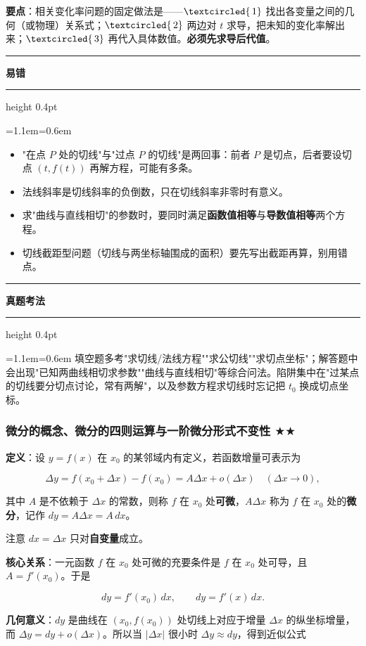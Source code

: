 \documentclass[11pt,openany,UTF8]{ctexbook}
\newcommand{\circled}[1]{\textcircled{\scriptsize\,#1}}
\newcommand{\callouthead}[2]{%
  \par\addvspace{7pt}\noindent
  {\color{#1}\rule[-0.15em]{3pt}{1.05em}}\hspace{0.5em}%
  {\bfseries\color{#1}#2}\par\nobreak\vspace{-0.35em}%
  {\color{rulesep}\hrule height 0.4pt}\nobreak\vspace{0.45em}%
  \begingroup\small\setlength{\parindent}{0pt}%
  \leftskip=1.1em\rightskip=0.6em\noindent\ignorespaces}
\newcommand{\calloutend}{\par\endgroup\addvspace{7pt}}
\newenvironment{callwarn}[1]{\callouthead{warnbar}{#1}}{\calloutend}
\newenvironment{callexam}[1]{\callouthead{exambar}{#1}}{\calloutend}
\begin{document}
\textbf{要点}：相关变化率问题的固定做法是——$\circled{1}$ 找出各变量之间的几何（或物理）关系式；$\circled{2}$ 两边对 $t$ 求导，把未知的变化率解出来；$\circled{3}$ 再代入具体数值。\textbf{必须先求导后代值}。

\begin{callwarn}{易错}
\begin{itemize}
\item "在点 $P$ 处的切线"与"过点 $P$ 的切线"是两回事：前者 $P$ 是切点，后者要设切点 $(t,f(t))$ 再解方程，可能有多条。
\item 法线斜率是切线斜率的负倒数，只在切线斜率非零时有意义。
\item 求"曲线与直线相切"的参数时，要同时满足\textbf{函数值相等}与\textbf{导数值相等}两个方程。
\item 切线截距型问题（切线与两坐标轴围成的面积）要先写出截距再算，别用错点。
\end{itemize}
\end{callwarn}

\begin{callexam}{真题考法}
填空题多考"求切线/法线方程""求公切线""求切点坐标"；解答题中会出现"已知两曲线相切求参数""曲线与直线相切"等综合问法。陷阱集中在"过某点的切线要分切点讨论，常有两解"，以及参数方程求切线时忘记把 $t_0$ 换成切点坐标。

\end{callexam}

\subsubsection{微分的概念、微分的四则运算与一阶微分形式不变性 $\bigstar$$\bigstar$}

\textbf{定义}：设 $y=f(x)$ 在 $x_0$ 的某邻域内有定义，若函数增量可表示为

\[\Delta y=f(x_0+\Delta x)-f(x_0)=A\Delta x+o(\Delta x)\quad(\Delta x\to 0),\]

其中 $A$ 是不依赖于 $\Delta x$ 的常数，则称 $f$ 在 $x_0$ 处\textbf{可微}，$A\Delta x$ 称为 $f$ 在 $x_0$ 处的\textbf{微分}，记作 $dy=A\Delta x=A\,dx$。

注意 $dx=\Delta x$ 只对\textbf{自变量}成立。

\textbf{核心关系}：一元函数 $f$ 在 $x_0$ 处可微的充要条件是 $f$ 在 $x_0$ 处可导，且 $A=f'(x_0)$。于是

\[dy=f'(x_0)\,dx,\qquad dy=f'(x)\,dx.\]

\textbf{几何意义}：$dy$ 是曲线在 $(x_0,f(x_0))$ 处切线上对应于增量 $\Delta x$ 的纵坐标增量，而 $\Delta y=dy+o(\Delta x)$。所以当 $|\Delta x|$ 很小时 $\Delta y\approx dy$，得到近似公式
\end{document}
